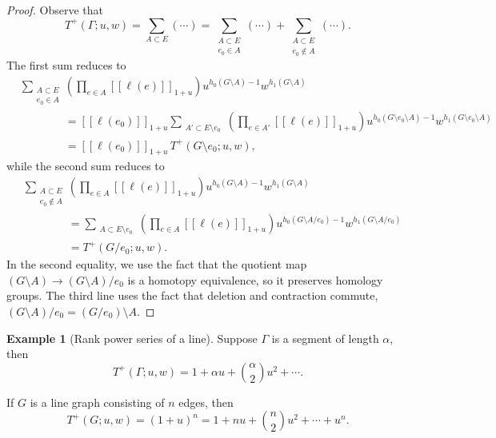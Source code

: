 \documentclass{amsart}
\theoremstyle{definition}
\newtheorem{eg}[thm]{Example}
\newcommand{\fanalog}[2]{[\![#2]\!]_{#1}}
\begin{document}
\begin{proof}
Observe that
\[
	T^+(\Gamma; u,w) 
	= \sum_{A \subset E} (\cdots)
	= \sum_{\substack{A \subset E \\ e_0 \in A}} (\cdots) + \sum_{\substack{A \subset E \\ e_0 \not \in A}} (\cdots).
\]
The first sum reduces to
\begin{align*}
	&\sum_{\substack{A \subset E \\ e_0 \in A}} \left( \prod_{e \in A} \fanalog{1+u}{\ell(e)} \right) u^{h_0(G\setminus A)-1}w^{h_1(G\setminus A)}\\
	&\qquad\qquad = \fanalog{1+u}{\ell(e_0)} \sum_{\substack{A' \subset E \setminus e_0}} \left( \prod_{e \in A'}\fanalog{1+u}{\ell(e)} \right) u^{h_0(G\setminus e_0\setminus A)-1}w^{h_1(G\setminus e_0\setminus A)} \\[1.5em]
	&\qquad\qquad = \fanalog{1+u}{\ell(e_0)}\, T^+(G\setminus e_0;u,w),
\end{align*}
while the second sum reduces to
\begin{align*}
	&\sum_{\substack{A \subset E \\ e_0 \not\in A}} \left( \prod_{e \in A} \fanalog{1+u}{\ell(e)} \right) u^{h_0(G\setminus A)-1}w^{h_1(G\setminus A)}\\
	&\qquad\qquad = \sum_{\substack{A \subset E \setminus e_0}} \left( \prod_{e \in A} \fanalog{1+u}{\ell(e)} \right) u^{h_0(G \setminus A / e_0)-1}w^{h_1(G\setminus A / e_0)} \\[1.5em]
	&\qquad\qquad = T^+(G/ e_0;u,w).
\end{align*}
In the second equality, we use the fact that the quotient map $(G\setminus A) \to (G\setminus A)/e_0$ is a homotopy equivalence, so it preserves homology groups. The third line uses the fact that deletion and contraction commute, $(G \setminus A) / e_0 = (G / e_0) \setminus A$.
\end{proof}

\begin{eg}[Rank power series of a line]
Suppose $\Gamma$ is a segment of length $\alpha$,
then
\[
	T^+(\Gamma;u,w) 
= 1 + \alpha u + \binom{\alpha}{2}u^2 + \cdots .
\]

If $G$ is a line graph consisting of $n$ edges,
then
\[
	T^+(G;u,w) = (1+u)^n = 1 + nu + \binom{n}{2}u^2 + \cdots + u^n.
\]
\end{eg}
\end{document}

